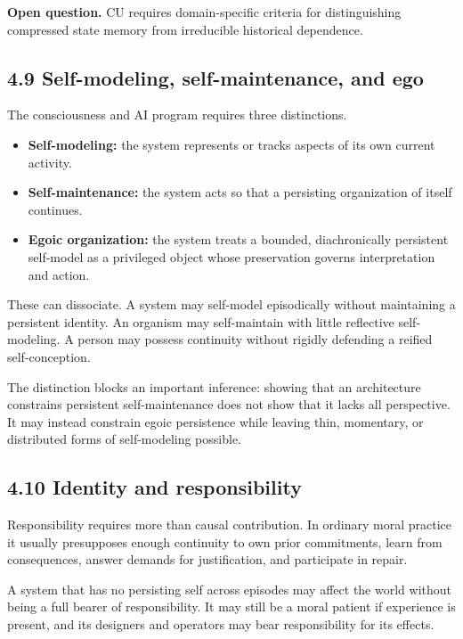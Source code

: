 \documentclass[
  11pt,
]{article}
\providecommand{\tightlist}{%
  \setlength{\itemsep}{0pt}\setlength{\parskip}{0pt}}
\begin{document}
\textbf{Open question.} CU requires domain-specific criteria for
distinguishing compressed state memory from irreducible historical
dependence.

\subsection{4.9 Self-modeling, self-maintenance, and
ego}\label{self-modeling-self-maintenance-and-ego}

The consciousness and AI program requires three distinctions.

\begin{itemize}
\tightlist
\item
  \textbf{Self-modeling:} the system represents or tracks aspects of its
  own current activity.
\item
  \textbf{Self-maintenance:} the system acts so that a persisting
  organization of itself continues.
\item
  \textbf{Egoic organization:} the system treats a bounded,
  diachronically persistent self-model as a privileged object whose
  preservation governs interpretation and action.
\end{itemize}

These can dissociate. A system may self-model episodically without
maintaining a persistent identity. An organism may self-maintain with
little reflective self-modeling. A person may possess continuity without
rigidly defending a reified self-conception.

The distinction blocks an important inference: showing that an
architecture constrains persistent self-maintenance does not show that
it lacks all perspective. It may instead constrain egoic persistence
while leaving thin, momentary, or distributed forms of self-modeling
possible.

\subsection{4.10 Identity and
responsibility}\label{identity-and-responsibility}

Responsibility requires more than causal contribution. In ordinary moral
practice it usually presupposes enough continuity to own prior
commitments, learn from consequences, answer demands for justification,
and participate in repair.

A system that has no persisting self across episodes may affect the
world without being a full bearer of responsibility. It may still be a
moral patient if experience is present, and its designers and operators
may bear responsibility for its effects.
\end{document}
